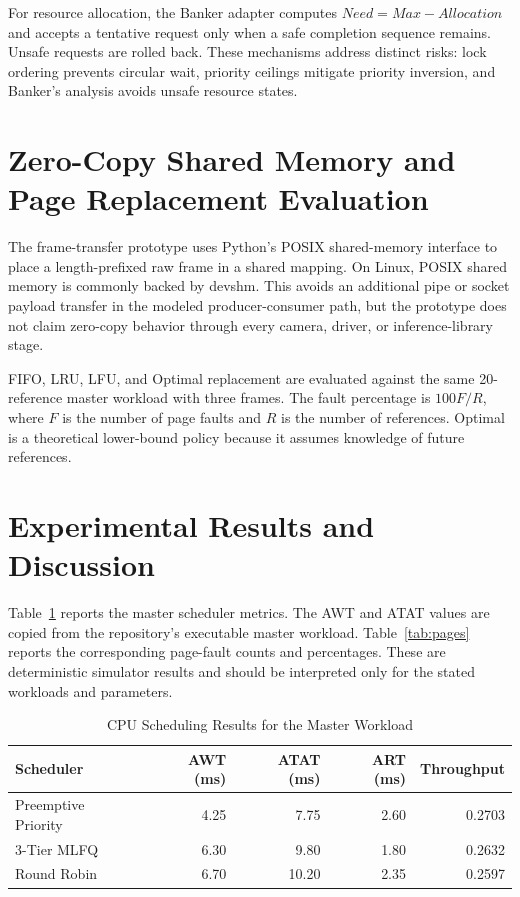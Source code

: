 \documentclass[conference]{IEEEtran}
\begin{document}
For resource allocation, the Banker adapter computes
$Need=Max-Allocation$ and accepts a tentative request only when a safe
completion sequence remains. Unsafe requests are rolled back. These
mechanisms address distinct risks: lock ordering prevents circular wait,
priority ceilings mitigate priority inversion, and Banker's analysis avoids
unsafe resource states.

\section{Zero-Copy Shared Memory and Page Replacement Evaluation}
The frame-transfer prototype uses Python's POSIX shared-memory interface to
place a length-prefixed raw frame in a shared mapping. On Linux, POSIX shared
memory is commonly backed by \/dev\/shm. This avoids an additional pipe or
socket payload transfer in the modeled producer-consumer path, but the
prototype does not claim zero-copy behavior through every camera, driver, or
inference-library stage.

FIFO, LRU, LFU, and Optimal replacement are evaluated against the same
20-reference master workload with three frames. The fault percentage is
$100F/R$, where $F$ is the number of page faults and $R$ is the number of
references. Optimal is a theoretical lower-bound policy because it assumes
knowledge of future references.

\section{Experimental Results and Discussion}
Table~\ref{tab:scheduling} reports the master scheduler metrics. The AWT and
ATAT values are copied from the repository's executable master workload.
Table~\ref{tab:pages} reports the corresponding page-fault counts and
percentages. These are deterministic simulator results and should be
interpreted only for the stated workloads and parameters.

\begin{table}[t]
\caption{CPU Scheduling Results for the Master Workload}
\label{tab:scheduling}
\centering
\begin{tabular}{lrrrr}
\toprule
Scheduler & AWT (ms) & ATAT (ms) & ART (ms) & Throughput \\
\midrule
Preemptive Priority & 4.25 & 7.75 & 2.60 & 0.2703 \\
3-Tier MLFQ & 6.30 & 9.80 & 1.80 & 0.2632 \\
Round Robin & 6.70 & 10.20 & 2.35 & 0.2597 \\
\bottomrule
\end{tabular}
\end{table}
\end{document}
